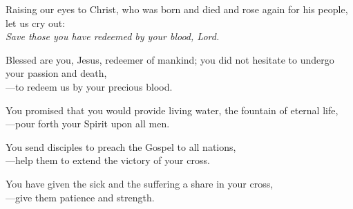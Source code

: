 \intercessions

\begin{raggedright}
Raising our eyes to Christ, who was born and died and rose again for his people, let us cry out:\\
\emph{Save those you have redeemed by your blood, Lord.}

\medskip
Blessed are you, Jesus, redeemer of mankind; you did not hesitate to undergo your passion and death,\\
{\color{red}---}to redeem us by your precious blood.

\medskip
You promised that you would provide living water, the fountain of eternal life,\\
{\color{red}---}pour forth your Spirit upon all men.

\medskip
You send disciples to preach the Gospel to all nations,\\
{\color{red}---}help them to extend the victory of your cross.

\medskip
You have given the sick and the suffering a share in your cross,\\
{\color{red}---}give them patience and strength.
\end{raggedright}